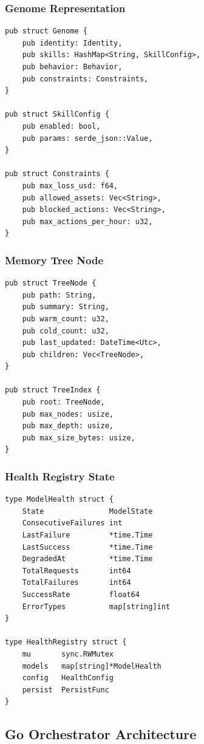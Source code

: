 \documentclass{article}
\begin{document}
\subsubsection{Genome Representation}

\begin{lstlisting}[style=rustcode]
pub struct Genome {
    pub identity: Identity,
    pub skills: HashMap<String, SkillConfig>,
    pub behavior: Behavior,
    pub constraints: Constraints,
}

pub struct SkillConfig {
    pub enabled: bool,
    pub params: serde_json::Value,
}

pub struct Constraints {
    pub max_loss_usd: f64,
    pub allowed_assets: Vec<String>,
    pub blocked_actions: Vec<String>,
    pub max_actions_per_hour: u32,
}
\end{lstlisting}

\subsubsection{Memory Tree Node}

\begin{lstlisting}[style=rustcode]
pub struct TreeNode {
    pub path: String,
    pub summary: String,
    pub warm_count: u32,
    pub cold_count: u32,
    pub last_updated: DateTime<Utc>,
    pub children: Vec<TreeNode>,
}

pub struct TreeIndex {
    pub root: TreeNode,
    pub max_nodes: usize,
    pub max_depth: usize,
    pub max_size_bytes: usize,
}
\end{lstlisting}

\subsubsection{Health Registry State}

\begin{lstlisting}[style=gocode]
type ModelHealth struct {
    State               ModelState
    ConsecutiveFailures int
    LastFailure         *time.Time
    LastSuccess         *time.Time
    DegradedAt          *time.Time
    TotalRequests       int64
    TotalFailures       int64
    SuccessRate         float64
    ErrorTypes          map[string]int
}

type HealthRegistry struct {
    mu       sync.RWMutex
    models   map[string]*ModelHealth
    config   HealthConfig
    persist  PersistFunc
}
\end{lstlisting}

\subsection{Go Orchestrator Architecture}
\end{document}

